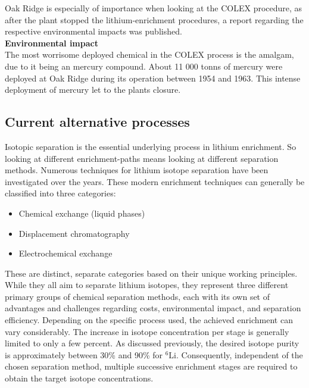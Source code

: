     Oak Ridge is especially of importance when looking at the COLEX procedure, as after the plant stopped the lithium-enrichment procedures, a report regarding the respective environmental impacts was published. \cite{AcostaFlexer2018}\\

    \textbf{Environmental impact}\\
    The most worrisome deployed chemical in the COLEX process is the amalgam, due to it being an mercury compound. About 11 000 tonns of mercury were deployed at Oak Ridge during its operation between 1954 and 1963. This intense deployment of mercury let to the plants closure. \cite{AcostaFlexer2018}


    \subsection{Current alternative processes} 
    \label{subsec_alternative_processes}
    Isotopic separation is the essential underlying process in lithium enrichment. So looking at different enrichment-paths means looking at different separation methods. \cite{BadeaLiIsotopes2023}
    Numerous techniques for lithium isotope separation have been investigated over the years. \cite{AcostaFlexer2018} These modern enrichment techniques can generally be classified into three categories: \cite{BadeaLiIsotopes2023}
    \begin{itemize}
        \item Chemical exchange (liquid phases)
        \item Displacement chromatography
        \item Electrochemical exchange
    \end{itemize}
    These are distinct, separate categories based on their unique working principles. While they all aim to separate lithium isotopes, they represent three different primary groups of chemical separation methods, each with its own set of advantages and challenges regarding costs, environmental impact, and separation efficiency. \cite{BadeaLiIsotopes2023}
    Depending on the specific process used, the achieved enrichment can vary considerably. The increase in isotope concentration per stage is generally limited to only a few percent. As discussed previously, the desired isotope purity is approximately between 30\% and 90\% for ${}^{6}\mathrm{Li}$. Consequently, independent of the chosen separation method, multiple successive enrichment stages are required to obtain the target isotope concentrations. \cite{AcostaFlexer2018}

